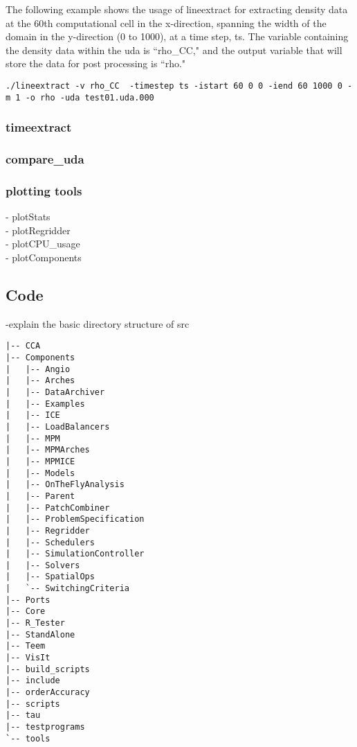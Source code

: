 The following example shows the usage of lineextract for extracting density data at the 60th computational cell in the x-direction, spanning the width of the domain in the y-direction (0 to 1000), at a time step, ts. The variable containing the density data within the uda is ``rho\_CC," and the output variable that will store the data for post processing is ``rho." 
\begin{Verbatim}[fontsize=\footnotesize]
./lineextract -v rho_CC  -timestep ts -istart 60 0 0 -iend 60 1000 0 -m 1 -o rho -uda test01.uda.000
\end{Verbatim}


\subsubsection{timeextract}

\subsubsection{compare\_uda}

\subsubsection{plotting tools}
- plotStats\\
- plotRegridder \\
- plotCPU\_usage \\
- plotComponents

\subsection{Code}
-explain the basic directory structure of src
\begin{Verbatim}[fontsize=\footnotesize]
|-- CCA
|-- Components
|   |-- Angio
|   |-- Arches
|   |-- DataArchiver
|   |-- Examples
|   |-- ICE
|   |-- LoadBalancers
|   |-- MPM
|   |-- MPMArches
|   |-- MPMICE
|   |-- Models
|   |-- OnTheFlyAnalysis
|   |-- Parent
|   |-- PatchCombiner
|   |-- ProblemSpecification
|   |-- Regridder
|   |-- Schedulers
|   |-- SimulationController
|   |-- Solvers
|   |-- SpatialOps
|   `-- SwitchingCriteria
|-- Ports
|-- Core
|-- R_Tester
|-- StandAlone
|-- Teem
|-- VisIt
|-- build_scripts
|-- include
|-- orderAccuracy
|-- scripts
|-- tau
|-- testprograms
`-- tools
\end{Verbatim}
